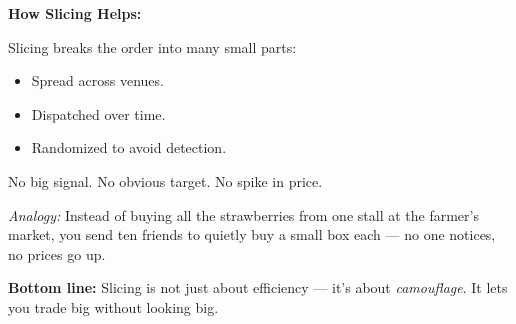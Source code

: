 \medskip

\textbf{How Slicing Helps:}

Slicing breaks the order into many small parts:
\begin{itemize}
  \item Spread across venues.
  \item Dispatched over time.
  \item Randomized to avoid detection.
\end{itemize}

No big signal. No obvious target. No spike in price.

\textit{Analogy:}  
Instead of buying all the strawberries from one stall at the farmer’s market,  
you send ten friends to quietly buy a small box each — no one notices, no prices go up.

\medskip

\textbf{Bottom line:}  
Slicing is not just about efficiency — it’s about \textit{camouflage}.  
It lets you trade big without looking big.



